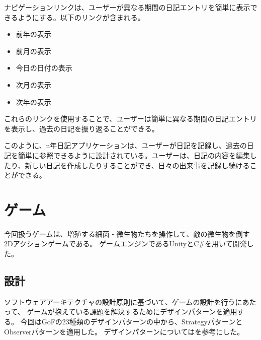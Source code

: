\documentclass[dvipdfmx,fleqn,article]{jlreq}
\begin{document}
ナビゲーションリンクは、ユーザーが異なる期間の日記エントリを簡単に表示できるようにする。以下のリンクが含まれる。

\begin{itemize}
    \item 前年の表示
    \item 前月の表示
    \item 今日の日付の表示
    \item 次月の表示
    \item 次年の表示
\end{itemize}

これらのリンクを使用することで、ユーザーは簡単に異なる期間の日記エントリを表示し、過去の日記を振り返ることができる。

このように、n年日記アプリケーションは、ユーザーが日記を記録し、過去の日記を簡単に参照できるように設計されている。ユーザーは、日記の内容を編集したり、新しい日記を作成したりすることができ、日々の出来事を記録し続けることができる。





























\section{ゲーム}
今回扱うゲームは、増殖する細菌・微生物たちを操作して、敵の微生物を倒す2Dアクションゲームである。
ゲームエンジンであるUnityとC\#を用いて開発した。

\subsection{設計}
ソフトウェアアーキテクチャの設計原則に基づいて、ゲームの設計を行うにあたって、
ゲームが抱えている課題を解決するためにデザインパターンを適用する。
今回はGoFの23種類のデザインパターンの中から、StrategyパターンとObserverパターンを適用した。
デザインパターンについては\cite{book1}を参考にした。
\end{document}
